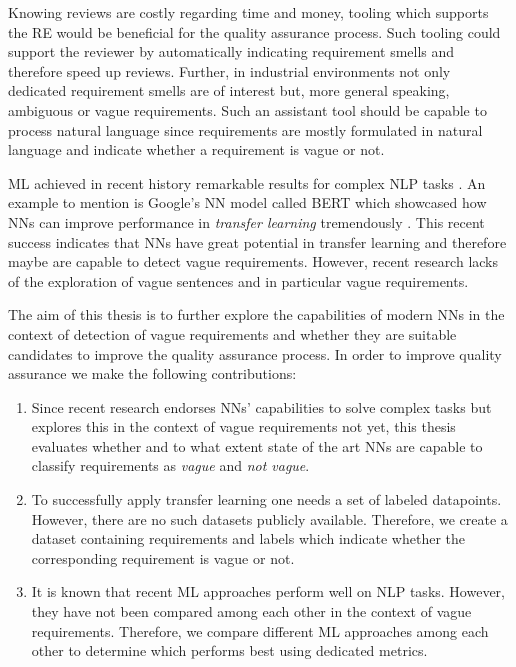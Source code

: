 Knowing reviews are costly regarding time and money, tooling which supports the \ac{RE} would be beneficial for the quality assurance process.
Such tooling could support the reviewer by automatically indicating requirement smells and therefore speed up reviews.
Further, in industrial environments not only dedicated requirement smells are of interest but, more general speaking, ambiguous or vague requirements.
Such an assistant tool should be capable to process natural language since requirements are mostly formulated in natural language \parencite{Mich:2004} and indicate whether a requirement is vague or not.

\Ac{ML} achieved in recent history remarkable results for complex \ac{NLP} tasks \parencite{Khan:2016}.
An example to mention is Google's \ac{NN} model called BERT which showcased how \acp{NN} can improve performance in \textit{transfer learning} tremendously \parencite{Devlin:2018}.
This recent success indicates that \acp{NN} have great potential in transfer learning and therefore maybe are capable to detect vague requirements.
However, recent research lacks of the exploration of vague sentences and in particular vague requirements.

The aim of this thesis is to further explore the capabilities of modern \acp{NN} in the context of detection of vague requirements and whether they are suitable candidates to improve the quality assurance process.
In order to improve quality assurance we make the following contributions:
\begin{enumerate}
    \item Since recent research endorses \acp{NN}' capabilities to solve complex tasks but explores this in the context of vague requirements not yet, this thesis evaluates whether and to what extent state of the art \acp{NN} are capable to classify requirements as \textit{vague} and \textit{not vague}.
    \item To successfully apply transfer learning one needs a set of labeled datapoints. However, there are no such datasets publicly available.
        Therefore, we create a dataset containing requirements and labels which indicate whether the corresponding requirement is vague or not.
    \item It is known that recent \ac{ML} approaches perform well on \ac{NLP} tasks.
        However, they have not been compared among each other in the context of vague requirements.
        Therefore, we compare different \ac{ML} approaches among each other to determine which performs best using dedicated metrics.
\end{enumerate}
